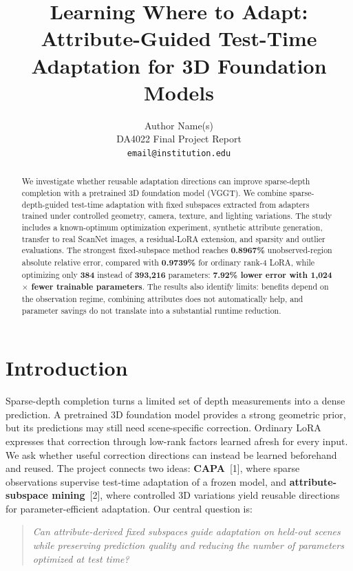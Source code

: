 \documentclass{article}
\title{Learning Where to Adapt: Attribute-Guided Test-Time Adaptation for 3D Foundation Models}
\author{%
  Author Name(s) \\
  DA4022 Final Project Report \\
  \texttt{email@institution.edu} \\
}
\begin{document}
\maketitle

\begin{abstract}
We investigate whether reusable adaptation directions can improve sparse-depth completion with a pretrained 3D foundation model (VGGT). We combine sparse-depth-guided test-time adaptation with fixed subspaces extracted from adapters trained under controlled geometry, camera, texture, and lighting variations. The study includes a known-optimum optimization experiment, synthetic attribute generation, transfer to real ScanNet images, a residual-LoRA extension, and sparsity and outlier evaluations. The strongest fixed-subspace method reaches \textbf{0.8967\%} unobserved-region absolute relative error, compared with \textbf{0.9739\%} for ordinary rank-4 LoRA, while optimizing only \textbf{384} instead of \textbf{393,216} parameters: \textbf{7.92\% lower error with 1,024$\times$ fewer trainable parameters}. The results also identify limits: benefits depend on the observation regime, combining attributes does not automatically help, and parameter savings do not translate into a substantial runtime reduction.
\end{abstract}

\section{Introduction}

Sparse-depth completion turns a limited set of depth measurements into a dense prediction. A pretrained 3D foundation model provides a strong geometric prior, but its predictions may still need scene-specific correction. Ordinary LoRA expresses that correction through low-rank factors learned afresh for every input. We ask whether useful correction directions can instead be learned beforehand and reused. The project connects two ideas: \textbf{CAPA}~[1], where sparse observations supervise test-time adaptation of a frozen model, and \textbf{attribute-subspace mining}~[2], where controlled 3D variations yield reusable directions for parameter-efficient adaptation. Our central question is:

\begin{quote}
\emph{Can attribute-derived fixed subspaces guide adaptation on held-out scenes while preserving prediction quality and reducing the number of parameters optimized at test time?}
\end{quote}
\end{document}
